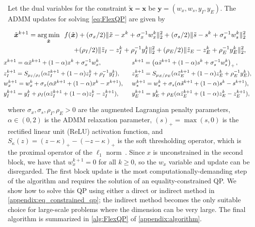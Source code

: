\documentclass{article} %
\DeclareMathOperator*{\argmin}{arg\,min}
\newcommand{\hquad}{\hspace{0.5em}}
\begin{document}
Let the dual variables for the constraint $\tilde{\boldsymbol{x}}  = \boldsymbol{x}$ be $\boldsymbol{y} = (w_x, w_s, y_I, y_E)$. The ADMM updates for solving \cref{eq:FlexQP} are given by
\begin{tcolorbox}[width=1.025\linewidth,boxrule=1pt,boxsep=0pt,colback=white,center]
\begin{equation} \label{eq:FlexQP_admm_updates}
\begin{aligned}[c]
    \tilde{\boldsymbol{x}}^{k + 1} = \argmin_{\tilde{\boldsymbol{x}}} \hquad f(\tilde{\boldsymbol{x}}) + (\sigma_x / 2) \lVert \tilde{x} - x^k + \sigma_x^{-1} w_x^k \rVert_2^2 + (\sigma_s / 2) \lVert \tilde{s} - s^k + \sigma_s^{-1} w_s^k \rVert_2^2 \\
    + (\rho_I / 2) \lVert \tilde{z}_I - z_I^k + \rho_I^{-1} y_I^k \rVert_2^2 + (\rho_E / 2) \lVert \tilde{z}_E - z_E^k + \rho_E^{-1} y_E^k \rVert_2^2,
\end{aligned}
\end{equation}
\begin{alignat*}{2}
    &\hspace{-0.75em}x^{k + 1} = \alpha \tilde{x}^{k + 1} + (1 - \alpha) x^k + \sigma_x^{-1} w_x^k, & &s^{k + 1} = \left(\alpha \tilde{s}^{k + 1} + (1 - \alpha) s^k + \sigma_s^{-1} w_s^k\right)_+, \\
    &\hspace{-0.75em}z_I^{k + 1} = S_{\mu_I/\rho_I} ( \alpha \tilde{z}_I^{k + 1} + (1 - \alpha) z_I^k + \rho_I^{-1} y_I^k ), & &z_E^{k + 1} = S_{\mu_E/\rho_E} ( \alpha \tilde{z}_E^{k + 1} + (1 - \alpha) z_E^k + \rho_E^{-1} y_E^k ), \\
    &\hspace{-0.75em}w_x^{k + 1} = w_x^k + \sigma_x (\alpha \tilde{x}^{k + 1} + (1 - \alpha) x^k - x^{k + 1}), &\hquad &w_s^{k + 1} = w_s^k + \sigma_s (\alpha \tilde{s}^{k + 1} + (1 - \alpha) s^k - s^{k + 1}), \\
    &\hspace{-0.75em}y_I^{k + 1} = y_I^k + \rho_I (\alpha \tilde{z}_I^{k + 1} + (1 - \alpha) z_I^k - z_I^{k + 1}), & &y_E^{k + 1} = y_E^k + \rho_E (\alpha \tilde{z}_E^{k + 1} + (1 - \alpha) z_E^k - z_E^{k + 1}),
\end{alignat*}
\end{tcolorbox}
where $\sigma_x, \sigma_s, \rho_I, \rho_E > 0$ are the augmented Lagrangian penalty parameters, $\alpha \in (0, 2)$ is the ADMM relaxation parameter, $(s)_+ = \max(s, 0)$ is the rectified linear unit (ReLU) activation function, and $S_{\kappa}(z) = (z - \kappa)_{+} - (-z - \kappa)_{+}$ is the soft thresholding operator, which is the proximal operator of the $\ell_1$ norm~\citep{boyd2011distributed}. Since $x$ is unconstrained in the second block, we have that $w_x^{k + 1} = 0$ for all $k \geq 0$, so the $w_x$ variable and update can be disregarded. The first block update is the most computationally-demanding step of the algorithm and requires the solution of an equality-constrained QP. We show how to solve this QP using either a direct or indirect method in \cref{appendix:eq_constrained_qp}; the indirect method becomes the only suitable choice for large-scale problems where the dimension can be very large. The final algorithm is summarized in \cref{alg:FlexQP} of \cref{appendix:algorithm}.
\end{document}
